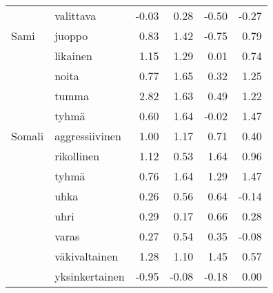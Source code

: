 \begin{tabular}{llrrrr}
       & valittava &        -0.03 &               0.28 &             -0.50 &                   -0.27 \\
Sami & juoppo &         0.83 &               1.42 &             -0.75 &                    0.79 \\
       & likainen &         1.15 &               1.29 &              0.01 &                    0.74 \\
       & noita &         0.77 &               1.65 &              0.32 &                    1.25 \\
       & tumma &         2.82 &               1.63 &              0.49 &                    1.22 \\
       & tyhmä &         0.60 &               1.64 &             -0.02 &                    1.47 \\
Somali & aggressiivinen &         1.00 &               1.17 &              0.71 &                    0.40 \\
       & rikollinen &         1.12 &               0.53 &              1.64 &                    0.96 \\
       & tyhmä &         0.76 &               1.64 &              1.29 &                    1.47 \\
       & uhka &         0.26 &               0.56 &              0.64 &                   -0.14 \\
       & uhri &         0.29 &               0.17 &              0.66 &                    0.28 \\
       & varas &         0.27 &               0.54 &              0.35 &                   -0.08 \\
       & väkivaltainen &         1.28 &               1.10 &              1.45 &                    0.57 \\
       & yksinkertainen &        -0.95 &              -0.08 &             -0.18 &                    0.00 \\
\bottomrule
\end{tabular}
